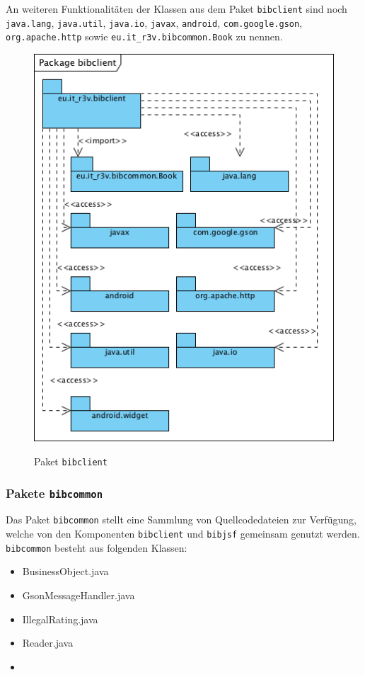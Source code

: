 \documentclass[fontsize=12pt,paper=a4,twoside]{scrartcl}
\begin{document}
\newpage

An weiteren Funktionalitäten der Klassen aus dem Paket \texttt{bibclient} sind noch \texttt{java.lang},
\texttt{java.util}, \texttt{java.io}, \texttt{javax}, \texttt{android}, \texttt{com.google.gson}, \texttt{org.apache.http} sowie \texttt{eu.it\_r3v.bibcommon.Book} zu nennen.

\begin{figure} [H] 
\caption{Paket \texttt{bibclient}} \centering
	\includegraphics[scale=2]{Diagramme/Packagebibclient.png} 
	\label{pic:PackageClient} 
\end{figure}


\subsubsection{Pakete \texttt{bibcommon}}
\label{sec:bibcommon}

Das Paket \texttt{bibcommon} stellt eine Sammlung von Quellcodedateien zur Verfügung, welche von den Komponenten \texttt{bibclient} und \texttt{bibjsf} gemeinsam genutzt werden. \texttt{bibcommon} besteht aus folgenden Klassen:

\begin{itemize}
\item{BusinessObject.java}
\item{GsonMessageHandler.java}
\item{IllegalRating.java}
\item{Reader.java}
\item{}
\end{itemize}
\end{document}
